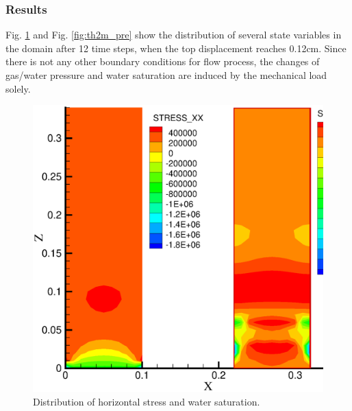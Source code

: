 \subsubsection*{Results}
 Fig. \ref{fig:th2m_ms} and Fig. \ref{fig:th2m_pre}  show the distribution of several state variables in the domain after 12 time steps, when the top displacement reaches 0.12cm.  Since there is not any other boundary conditions for flow process, the changes of gas/water pressure and water saturation are induced by the mechanical load solely.
\begin{figure}[!thb]
\begin{center}
\includegraphics[scale=0.4]{TH2M/figure/ms.eps}
\end{center}
\caption{Distribution of horizontal stress and water saturation.}
 \label{fig:th2m_ms}
\end{figure}
